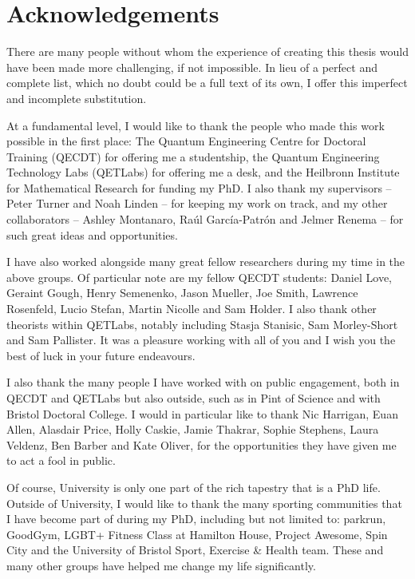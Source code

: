 \chapter*{Acknowledgements}

There are many people without whom the experience of creating this thesis would have been made more challenging, if not impossible. In lieu of a perfect and complete list, which no doubt could be a full text of its own, I offer this imperfect and incomplete substitution.

At a fundamental level, I would like to thank the people who made this work possible in the first place: The Quantum Engineering Centre for Doctoral Training (QECDT) for offering me a studentship, the Quantum Engineering Technology Labs (QETLabs) for offering me a desk, and the Heilbronn Institute for Mathematical Research for funding my PhD. I also thank my supervisors -- Peter Turner and Noah Linden -- for keeping my work on track, and my other collaborators -- Ashley Montanaro, Ra\'{u}l Garc\'{i}a-Patr\'{o}n and Jelmer Renema -- for such great ideas and opportunities.

I have also worked alongside many great fellow researchers during my time in the above groups. Of particular note are my fellow QECDT students: Daniel Love, Geraint Gough, Henry Semenenko, Jason Mueller, Joe Smith, Lawrence Rosenfeld, Lucio Stefan, Martin Nicolle and Sam Holder. I also thank other theorists within QETLabs, notably including Stasja Stanisic, Sam Morley-Short and Sam Pallister. It was a pleasure working with all of you and I wish you the best of luck in your future endeavours.

I also thank the many people I have worked with on public engagement, both in QECDT and QETLabs but also outside, such as in Pint of Science and with Bristol Doctoral College. I would in particular like to thank Nic Harrigan, Euan Allen, Alasdair Price, Holly Caskie, Jamie Thakrar, Sophie Stephens, Laura Veldenz, Ben Barber and Kate Oliver, for the opportunities they have given me to act a fool in public.

Of course, University is only one part of the rich tapestry that is a PhD life. Outside of University, I would like to thank the many sporting communities that I have become part of during my PhD, including but not limited to: parkrun, GoodGym, LGBT+ Fitness Class at Hamilton House, Project Awesome, Spin City and the University of Bristol Sport, Exercise \& Health team. These and many other groups have helped me change my life significantly.

